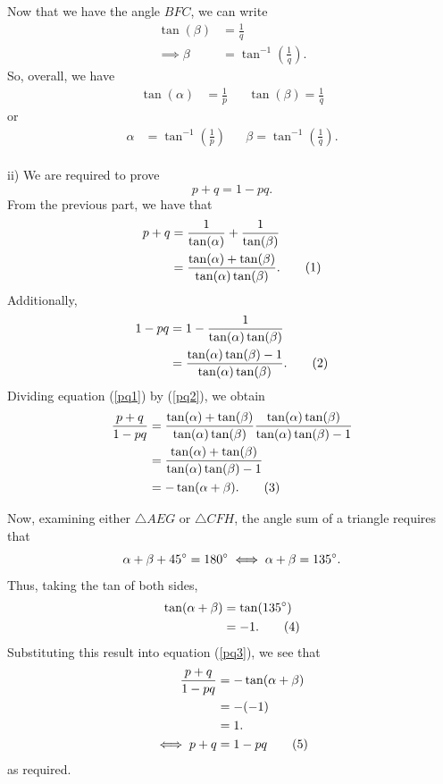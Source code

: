 \documentclass[a4paper,11pt]{article}
\newcommand\numberthis{\addtocounter{equation}{1}\tag{\theequation}}
\begin{document}
Now that we have the angle $BFC$, we can write 
\begin{align*}
\tan(\beta) &= \frac{1}{q}\\
\implies \beta &= \tan^{-1}\left(\frac{1}{q}\right).
\end{align*}
So, overall, we have
\begin{align*}
\tan(\alpha) &= \frac{1}{p} && \tan(\beta) = \frac{1}{q}
\end{align*}
or
\begin{align*}
\alpha &= \tan^{-1}\left(\frac{1}{p}\right) && \beta = \tan^{-1}\left(\frac{1}{q}\right).
\end{align*}\\

ii) We are required to prove 
$$
p+q = 1-pq.
$$
From the previous part, we have that 
\begin{align*}
p+q &= \frac{1}{\tan(\alpha)} + \frac{1}{\tan(\beta)}\\
&= \frac{\tan(\alpha) + \tan(\beta)}{\tan(\alpha)\tan(\beta)}.\numberthis\label{pq1}
\end{align*}
Additionally, 
\begin{align*}
1-pq &= 1-\frac{1}{\tan(\alpha)\tan(\beta)}\\
&= \frac{\tan(\alpha)\tan(\beta)-1}{\tan(\alpha)\tan(\beta)}.\numberthis\label{pq2}
\end{align*}
Dividing equation (\ref{pq1}) by (\ref{pq2}), we obtain
\begin{align*}
\frac{p+q}{1-pq} &= \frac{\tan(\alpha) + \tan(\beta)}{\tan(\alpha)\tan(\beta)}\frac{\tan(\alpha)\tan(\beta)}{\tan(\alpha)\tan(\beta)-1}\\
&= \frac{\tan(\alpha)+\tan(\beta)}{\tan(\alpha)\tan(\beta)-1}\\
&=-\tan(\alpha+\beta).\numberthis\label{pq3}
\end{align*}
\pagebreak

\noindent Now, examining either $\triangle AEG$ or $\triangle CFH$, the angle sum of a triangle requires that
$$
\alpha+\beta+45\degree = 180\degree \iff \alpha+\beta = 135\degree.
$$
Thus, taking the tan of both sides,
\begin{align*}
\tan(\alpha+\beta) &= \tan(135\degree)\\
&= -1.\numberthis\label{pq4}
\end{align*}
Substituting this result into equation (\ref{pq3}), we see that
\begin{align*}
\frac{p+q}{1-pq} &= -\tan(\alpha+\beta)\\
&= -(-1)\\
&= 1.\\
\iff p+q &= 1-pq \numberthis\label{pq5}
\end{align*}
as required.\\
\end{document}
